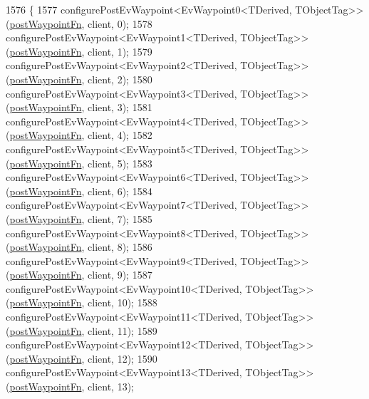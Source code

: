\begin{DoxyCode}
1576 \{
1577     configurePostEvWaypoint<EvWaypoint0<TDerived, TObjectTag>>(\hyperlink{classsmacc_1_1WaypointEventDispatcher_a6bccf6a93a827634b7b5e67ac0e4ec57}{postWaypointFn}, client, 0);
1578     configurePostEvWaypoint<EvWaypoint1<TDerived, TObjectTag>>(\hyperlink{classsmacc_1_1WaypointEventDispatcher_a6bccf6a93a827634b7b5e67ac0e4ec57}{postWaypointFn}, client, 1);
1579     configurePostEvWaypoint<EvWaypoint2<TDerived, TObjectTag>>(\hyperlink{classsmacc_1_1WaypointEventDispatcher_a6bccf6a93a827634b7b5e67ac0e4ec57}{postWaypointFn}, client, 2);
1580     configurePostEvWaypoint<EvWaypoint3<TDerived, TObjectTag>>(\hyperlink{classsmacc_1_1WaypointEventDispatcher_a6bccf6a93a827634b7b5e67ac0e4ec57}{postWaypointFn}, client, 3);
1581     configurePostEvWaypoint<EvWaypoint4<TDerived, TObjectTag>>(\hyperlink{classsmacc_1_1WaypointEventDispatcher_a6bccf6a93a827634b7b5e67ac0e4ec57}{postWaypointFn}, client, 4);
1582     configurePostEvWaypoint<EvWaypoint5<TDerived, TObjectTag>>(\hyperlink{classsmacc_1_1WaypointEventDispatcher_a6bccf6a93a827634b7b5e67ac0e4ec57}{postWaypointFn}, client, 5);
1583     configurePostEvWaypoint<EvWaypoint6<TDerived, TObjectTag>>(\hyperlink{classsmacc_1_1WaypointEventDispatcher_a6bccf6a93a827634b7b5e67ac0e4ec57}{postWaypointFn}, client, 6);
1584     configurePostEvWaypoint<EvWaypoint7<TDerived, TObjectTag>>(\hyperlink{classsmacc_1_1WaypointEventDispatcher_a6bccf6a93a827634b7b5e67ac0e4ec57}{postWaypointFn}, client, 7);
1585     configurePostEvWaypoint<EvWaypoint8<TDerived, TObjectTag>>(\hyperlink{classsmacc_1_1WaypointEventDispatcher_a6bccf6a93a827634b7b5e67ac0e4ec57}{postWaypointFn}, client, 8);
1586     configurePostEvWaypoint<EvWaypoint9<TDerived, TObjectTag>>(\hyperlink{classsmacc_1_1WaypointEventDispatcher_a6bccf6a93a827634b7b5e67ac0e4ec57}{postWaypointFn}, client, 9);
1587     configurePostEvWaypoint<EvWaypoint10<TDerived, TObjectTag>>(\hyperlink{classsmacc_1_1WaypointEventDispatcher_a6bccf6a93a827634b7b5e67ac0e4ec57}{postWaypointFn}, client, 10);
1588     configurePostEvWaypoint<EvWaypoint11<TDerived, TObjectTag>>(\hyperlink{classsmacc_1_1WaypointEventDispatcher_a6bccf6a93a827634b7b5e67ac0e4ec57}{postWaypointFn}, client, 11);
1589     configurePostEvWaypoint<EvWaypoint12<TDerived, TObjectTag>>(\hyperlink{classsmacc_1_1WaypointEventDispatcher_a6bccf6a93a827634b7b5e67ac0e4ec57}{postWaypointFn}, client, 12);
1590     configurePostEvWaypoint<EvWaypoint13<TDerived, TObjectTag>>(\hyperlink{classsmacc_1_1WaypointEventDispatcher_a6bccf6a93a827634b7b5e67ac0e4ec57}{postWaypointFn}, client, 13);

\end{DoxyCode}
